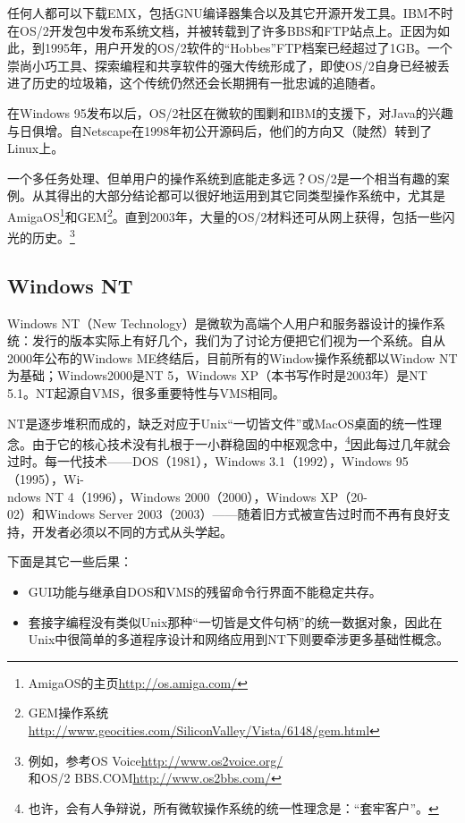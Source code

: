 \documentclass[12pt,oneside]{book}
\begin{document}
任何人都可以下载EMX，包括GNU编译器集合以及其它开源开发工具。IBM不时在OS/2开发包中发布系统文档，并被转载到了许多BBS和FTP站点上。正因为如此，到1995年，用户开发的OS/2软件的“Hobbes”FTP档案已经超过了1GB。一个崇尚小巧工具、探索编程和共享软件的强大传统形成了，即使OS/2自身已经被丢进了历史的垃圾箱，这个传统仍然还会长期拥有一批忠诚的追随者。

在Windows 95发布以后，OS/2社区在微软的围剿和IBM的支援下，对Java的兴趣与日俱增。自Netscape在1998年初公开源码后，他们的方向又（陡然）转到了Linux上。

一个多任务处理、但单用户的操作系统到底能走多远？OS/2是一个相当有趣的案例。从其得出的大部分结论都可以很好地运用到其它同类型操作系统中，尤其是AmigaOS\footnote{AmigaOS的主页\href{http://os.amiga.com/}{http://os.amiga.com/}}和GEM\footnote{GEM操作系统\\ \href{http://www.geocities.com/SiliconValley/Vista/6148/gem.html}{http://www.geocities.com/SiliconValley/Vista/6148/gem.html}}。直到2003年，大量的OS/2材料还可从网上获得，包括一些闪光的历史。\footnote{例如，参考OS Voice\href{http://www.os2voice.org/}{http://www.os2voice.org/}\\和OS/2 BBS.COM\href{http://www.os2bbs.com/}{http://www.os2bbs.com/}}


\subsection{Windows NT}
Windows NT（New Technology）是微软为高端个人用户和服务器设计的操作系统：发行的版本实际上有好几个，我们为了讨论方便把它们视为一个系统。自从2000年公布的Windows ME终结后，目前所有的Window操作系统都以Window NT为基础；Windows2000是NT 5，Windows XP（本书写作时是2003年）是NT 5.1。NT起源自VMS，很多重要特性与VMS相同。

NT是逐步堆积而成的，缺乏对应于Unix“一切皆文件”或MacOS桌面的统一性理念。由于它的核心技术没有扎根于一小群稳固的中枢观念中，\footnote{也许，会有人争辩说，所有微软操作系统的统一性理念是：“套牢客户”。}因此每过几年就会过时。每一代技术——DOS（1981），Windows 3.1（1992），Windows 95（1995），Wi-\\ndows NT 4（1996），Windows 2000（2000），Windows XP（20-\\02）和Windows Server 2003（2003）——随着旧方式被宣告过时而不再有良好支持，开发者必须以不同的方式从头学起。

下面是其它一些后果：
\begin{itemize}
\item GUI功能与继承自DOS和VMS的残留命令行界面不能稳定共存。
\item 套接字编程没有类似Unix那种“一切皆是文件句柄”的统一数据对象，因此在Unix中很简单的多道程序设计和网络应用到NT下则要牵涉更多基础性概念。
\end{itemize}
\end{document}
